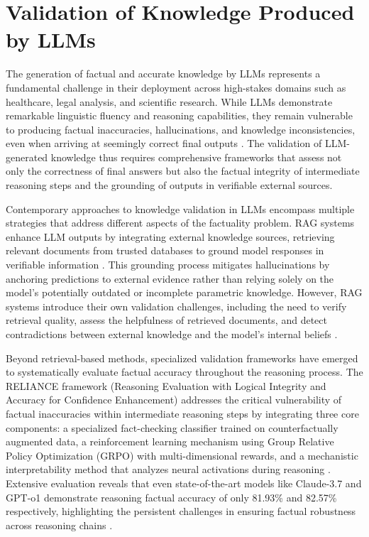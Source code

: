 \section{Validation of Knowledge Produced by LLMs}

The generation of factual and accurate knowledge by LLMs represents a fundamental challenge in their deployment across high-stakes domains such as healthcare, legal analysis, and scientific research. While LLMs demonstrate remarkable linguistic fluency and reasoning capabilities, they remain vulnerable to producing factual inaccuracies, hallucinations, and knowledge inconsistencies, even when arriving at seemingly correct final outputs \cite{wang2024reliance}. The validation of LLM-generated knowledge thus requires comprehensive frameworks that assess not only the correctness of final answers but also the factual integrity of intermediate reasoning steps and the grounding of outputs in verifiable external sources.

Contemporary approaches to knowledge validation in LLMs encompass multiple strategies that address different aspects of the factuality problem. RAG systems enhance LLM outputs by integrating external knowledge sources, retrieving relevant documents from trusted databases to ground model responses in verifiable information \cite{zeng2025knowledge}. This grounding process mitigates hallucinations by anchoring predictions to external evidence rather than relying solely on the model's potentially outdated or incomplete parametric knowledge. However, RAG systems introduce their own validation challenges, including the need to verify retrieval quality, assess the helpfulness of retrieved documents, and detect contradictions between external knowledge and the model's internal beliefs \cite{zeng2025knowledge}.

Beyond retrieval-based methods, specialized validation frameworks have emerged to systematically evaluate factual accuracy throughout the reasoning process. The RELIANCE framework (Reasoning Evaluation with Logical Integrity and Accuracy for Confidence Enhancement) addresses the critical vulnerability of factual inaccuracies within intermediate reasoning steps by integrating three core components: a specialized fact-checking classifier trained on counterfactually augmented data, a reinforcement learning mechanism using Group Relative Policy Optimization (GRPO) with multi-dimensional rewards, and a mechanistic interpretability method that analyzes neural activations during reasoning \cite{wang2024reliance}. Extensive evaluation reveals that even state-of-the-art models like Claude-3.7 and GPT-o1 demonstrate reasoning factual accuracy of only 81.93\% and 82.57\% respectively, highlighting the persistent challenges in ensuring factual robustness across reasoning chains \cite{wang2024reliance}.

